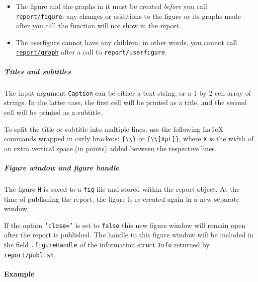 \begin{itemize}
\item
  The figure and the graphs in it must be created \emph{before} you call
  \texttt{report/figure}: any changes or additions to the figure or its
  graphs made after you call the function will not show in the report.
\item
  The userfigure cannot have any children; in other words, you cannot
  call \href{report/graph}{\texttt{report/graph}} after a call to
  \texttt{report/userfigure}.
\end{itemize}

\subparagraph{Titles and subtitles}

The input argument \texttt{Caption} can be either a text string, or a
1-by-2 cell array of strings. In the latter case, the first cell will be
printed as a title, and the second cell will be printed as a subtitle.

To split the title or subtitle into multiple lines, use the following
LaTeX commands wrapped in curly brackets:
\texttt{\{\textbackslash{}\textbackslash{}\}} or
\texttt{\{\textbackslash{}\textbackslash{}{[}Xpt{]}\}}, where \texttt{X}
is the width of an extra vertical space (in points) added between the
respective lines.

\subparagraph{Figure window and figure
handle}

The figure \texttt{H} is saved to a \texttt{fig} file and stored within
the report object. At the time of publishing the report, the figure is
re-created again in a new separate window.

If the option \texttt{'close='} is set to \texttt{false} this new figure
window will remain open after the report is published. The handle to
this figure window will be included in the field \texttt{.figureHandle}
of the information struct \texttt{Info} returned by
\href{report/publish}{\texttt{report/publish}}.

\paragraph{Example}


